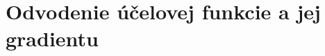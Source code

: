 \documentclass[report.tex]{subfiles}
\begin{document}
\section{Odvodenie účelovej funkcie a jej gradientu}\label{sec:AB}
\end{document}
